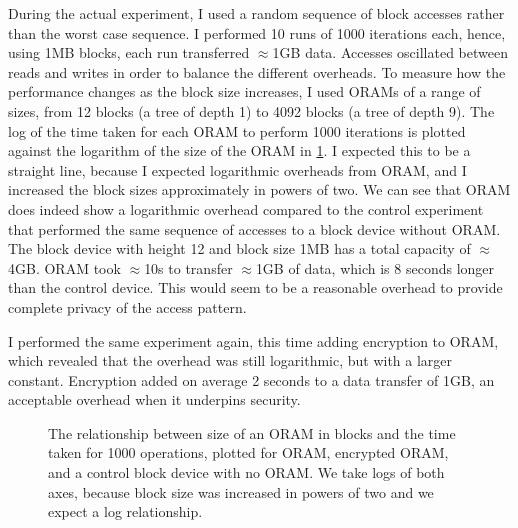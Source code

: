 \documentclass[12pt,a4paper,twoside,openright]{report}
\begin{document}
During the actual experiment, I used a random sequence of block accesses rather than the worst case sequence. I performed 10 runs of 1000 iterations each, hence, using 1MB blocks, each run transferred $\approx$1GB data. Accesses oscillated between reads and writes in order to balance the different overheads. To measure how the performance changes as the block size increases, I used ORAMs of a range of sizes, from 12 blocks (a tree of depth 1) to 4092 blocks (a tree of depth 9). The log of the time taken for each ORAM to perform 1000 iterations is plotted against the logarithm of the size of the ORAM in \cref{fig:timeResults}. I expected this to be a straight line, because I expected logarithmic overheads from ORAM, and I increased the block sizes approximately in powers of two. We can see that ORAM does indeed show a logarithmic overhead compared to the control experiment that performed the same sequence of accesses to a block device without ORAM. The block device with height 12 and block size 1MB has a total capacity of $\approx$4GB. ORAM took $\approx$10s to transfer $\approx$1GB of data, which is 8 seconds longer than the control device. This would seem to be a reasonable overhead to provide complete privacy of the access pattern.

I performed the same experiment again, this time adding encryption to ORAM, which revealed that the overhead was still logarithmic, but with a larger constant. Encryption added on average 2 seconds to a data transfer of 1GB, an acceptable overhead when it underpins security.

\begin{figure}
    \centering
    
    \caption{The relationship between size of an ORAM in blocks and the time taken for 1000 operations, plotted for ORAM, encrypted ORAM, and a control block device with no ORAM. We take logs of both axes, because block size was increased in powers of two and we expect a log relationship.}
    \label{fig:timeResults}
\end{figure}


\end{document}
